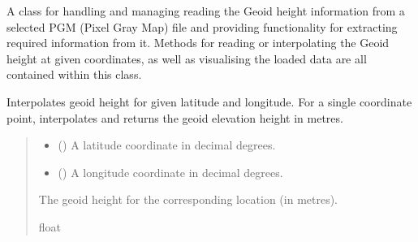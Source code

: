 \documentclass[letterpaper,10pt,english]{sphinxmanual}
\begin{document}
\begin{fulllineitems}
\label{\detokenize{modules/earth/geoid:qnav.earth.geoid.GeoidPGM}}
\pysigstartsignatures
{}
\pysigstopsignatures
\sphinxAtStartPar
A class for handling and managing reading the Geoid height information
from a selected PGM (Pixel Gray Map) file and providing functionality for
extracting required information from it. Methods for reading or
interpolating the Geoid height at given coordinates, as well as
visualising the loaded data are all contained within this class.

\begin{fulllineitems}
\label{\detokenize{modules/earth/geoid:qnav.earth.geoid.GeoidPGM.get_height}}
\pysigstartsignatures
{}
\pysigstopsignatures
\sphinxAtStartPar
Interpolates geoid height for given latitude and longitude.
For a single coordinate point, interpolates and returns the geoid
elevation height in metres.
\begin{quote}\begin{description}
\begin{itemize}
\item {} 
\sphinxAtStartPar
{} () \textendash{} A latitude coordinate in decimal degrees.

\item {} 
\sphinxAtStartPar
{} () \textendash{} A longitude coordinate in decimal degrees.

\end{itemize}

\sphinxAtStartPar
The geoid height for the corresponding location (in metres).

\sphinxAtStartPar
float


\end{description}
\end{quote}
\end{fulllineitems}
\end{fulllineitems}
\end{document}
